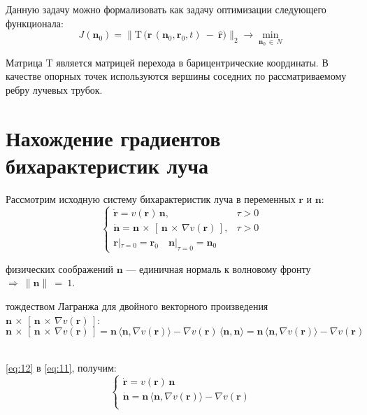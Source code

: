 \documentclass[12pt, cleqn, a4paper]{article}
\newcommand{\bfv}[1]{\mathbf{#1}}
\newcommand{\dd}[1]{\dot{#1}}
\newcommand{\dvp}[3]{#1\,\times\,[\,#2\,\times\,#3\,]}
\newcommand{\dv}[1]{\nabla v(#1)}
\newcommand{\dprod}[2]{\langle #1, #2 \rangle}
\newcommand{\matr}[1]{\mathrm{#1}}
\newcommand{\hr}{\hat{\bfv{r}}}
\begin{document}
Данную задачу можно формализовать как задачу оптимизации следующего функционала:
\begin{equation} \label{eq:02}
J(\bfv{n}_0) = \big\|\matr{T}\,\big(\bfv{r}\,(\bfv{n}_0, \bfv{r}_0, t) \ - \ \hr \big)\big\|_2 \rightarrow \min_{\bfv{n}_0\,\in\,N}
\end{equation}

Матрица $\matr{T}$ является матрицей перехода в барицентрические координаты. В качестве опорных точек используются вершины соседних по рассматриваемому ребру лучевых трубок. 

\newpage
\section{Нахождение градиентов бихарактеристик луча}
Рассмотрим исходную систему бихарактеристик луча в переменных $\bfv{r}$ и $\bfv{n}$:
\begin{equation} \label{eq:11}
\begin{cases}
\dd{\bfv{r}} = v(\bfv{r})\,\bfv{n}, &\tau > 0\\
\dd{\bfv{n}} = \dvp{\bfv{n}}{\bfv{n}}{\dv{\bfv{r}}}, &\tau > 0\\
\bfv{r}|_{\tau=0} = \bfv{r}_0 \quad \bfv{n}|_{\tau=0} = \bfv{n}_0
\end{cases}
\end{equation}

 физических соображений $\bfv{n}$ --- единичная нормаль к волновому фронту $\Rightarrow \ \|\bfv{n}\|~=~1$.

 тождеством Лагранжа для двойного векторного произведения \\ $\dvp{\bfv{n}}{\bfv{n}}{\dv{\bfv{r}}}$:
\begin{equation} \label{eq:12}
    \dvp{\bfv{n}}{\bfv{n}}{\dv{\bfv{r}}} = \bfv{n}\,\dprod{\bfv{n}}{\dv{\bfv{r}}} - \dv{\bfv{r}}\,\dprod{\bfv{n}}{\bfv{n}} = \bfv{n}\,\dprod{\bfv{n}}{\dv{\bfv{r}}} - \dv{\bfv{r}}
\end{equation}\

 \eqref{eq:12} в \eqref{eq:11}, получим:
\begin{equation} \label{eq:13}
\begin{cases}
\dd{\bfv{r}} = v(\bfv{r})\,\bfv{n}\\
\dd{\bfv{n}} =  \bfv{n}\,\dprod{\bfv{n}}{\dv{\bfv{r}}} - \dv{\bfv{r}}\\
\end{cases}
\end{equation}\vspace{1mm}
\end{document}
